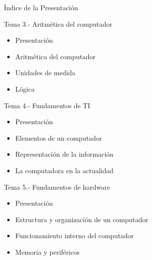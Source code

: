 \documentclass[10pt, aspectratio=169]{beamer}
\begin{document}
	\begin{frame}{Índice de la Presentación}
		
		\small
		
		\begin{block}{Tema 3.- Aritmética del computador}
			\begin{itemize}
				\item Presentación
				\item Aritmética del computador
				\item Unidades de medida
				\item Lógica
			\end{itemize}
		\end{block}
		
		\begin{block}{Tema 4.- Fundamentos de TI}
			\begin{itemize}
				\item Presentación
				\item Elementos de un computador
				\item Representación de la información
				\item La computadora en la actualidad
			\end{itemize}
		\end{block}
		
		\begin{block}{Tema 5.- Fundamentos de hardware}
			\begin{itemize}
				\item Presentación
				\item Estructura y organización de un computador
				\item Funcionamiento interno del computador
				\item Memoria y periféricos
			\end{itemize}
		\end{block}
		
	\end{frame}
	
\end{document}
